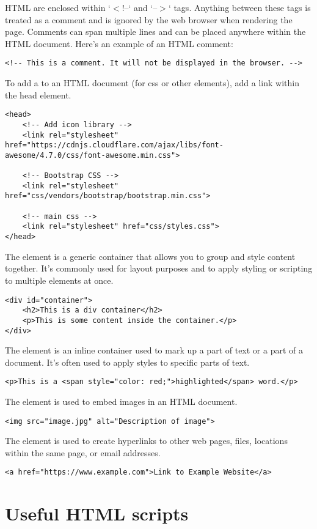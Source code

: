 HTML  are enclosed within `$<$!--` and `--$>$` tags. Anything between these tags is treated as a comment and is ignored by the web browser when rendering the page. Comments can span multiple lines and can be placed anywhere within the HTML document. Here's an example of an HTML comment:
\begin{lstlisting}
<!-- This is a comment. It will not be displayed in the browser. -->
\end{lstlisting}

To add a  to an HTML document (for css or other elements), add a link within the head element.
\begin{lstlisting}
<head>		
	<!-- Add icon library -->
	<link rel="stylesheet" href="https://cdnjs.cloudflare.com/ajax/libs/font-awesome/4.7.0/css/font-awesome.min.css">		
		
	<!-- Bootstrap CSS -->
	<link rel="stylesheet" href="css/vendors/bootstrap/bootstrap.min.css">
	
	<!-- main css -->
	<link rel="stylesheet" href="css/styles.css">
</head>
\end{lstlisting}

The  element is a generic container that allows you to group and style content together. It's commonly used for layout purposes and to apply styling or scripting to multiple elements at once.

\begin{lstlisting}
<div id="container">
    <h2>This is a div container</h2>
    <p>This is some content inside the container.</p>
</div>
\end{lstlisting}

The  element is an inline container used to mark up a part of text or a part of a document. It's often used to apply styles to specific parts of text.

\begin{lstlisting}
<p>This is a <span style="color: red;">highlighted</span> word.</p>
\end{lstlisting}

The  element is used to embed images in an HTML document.

\begin{lstlisting}
<img src="image.jpg" alt="Description of image">
\end{lstlisting}

The  element is used to create hyperlinks to other web pages, files, locations within the same page, or email addresses.

\begin{lstlisting}
<a href="https://www.example.com">Link to Example Website</a>
\end{lstlisting}














\section{Useful HTML scripts}



